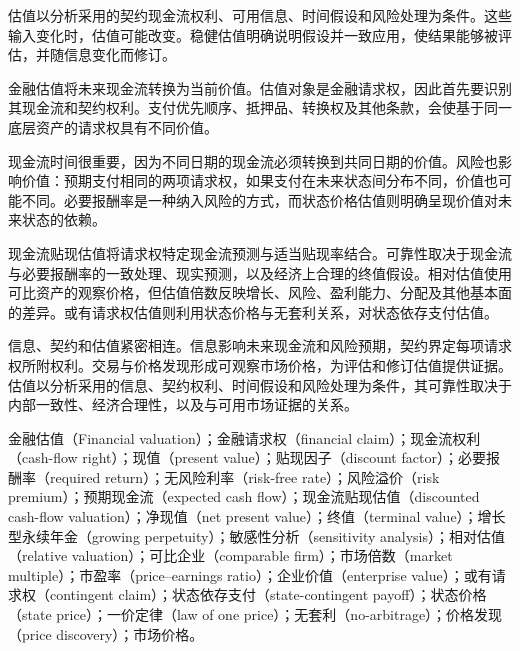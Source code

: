 \begin{tcolorbox}[
  enhanced,
  breakable,
  colback=white,
  colframe=FinanceBlue,
  boxrule=0.7pt,
  sharp corners,
  borderline west={2.2pt}{0pt}{FinanceBlue},
  title=\textbf{金融视角：估值以假设为条件},
  coltitle=white,
  colbacktitle=FinanceBlue,
  fonttitle=\bfseries,
  before skip=1.2em,
  after skip=1.2em
]

估值以分析采用的契约现金流权利、可用信息、时间假设和风险处理为条件。这些输入变化时，估值可能改变。稳健估值明确说明假设并一致应用，使结果能够被评估，并随信息变化而修订。

\end{tcolorbox}



金融估值将未来现金流转换为当前价值。估值对象是金融请求权，因此首先要识别其现金流和契约权利。支付优先顺序、抵押品、转换权及其他条款，会使基于同一底层资产的请求权具有不同价值。

现金流时间很重要，因为不同日期的现金流必须转换到共同日期的价值。风险也影响价值：预期支付相同的两项请求权，如果支付在未来状态间分布不同，价值也可能不同。必要报酬率是一种纳入风险的方式，而状态价格估值则明确呈现价值对未来状态的依赖。

现金流贴现估值将请求权特定现金流预测与适当贴现率结合。可靠性取决于现金流与必要报酬率的一致处理、现实预测，以及经济上合理的终值假设。相对估值使用可比资产的观察价格，但估值倍数反映增长、风险、盈利能力、分配及其他基本面的差异。或有请求权估值则利用状态价格与无套利关系，对状态依存支付估值。

信息、契约和估值紧密相连。信息影响未来现金流和风险预期，契约界定每项请求权所附权利。交易与价格发现形成可观察市场价格，为评估和修订估值提供证据。估值以分析采用的信息、契约权利、时间假设和风险处理为条件，其可靠性取决于内部一致性、经济合理性，以及与可用市场证据的关系。



金融估值（Financial valuation）；金融请求权（financial claim）；现金流权利（cash-flow right）；现值（present value）；贴现因子（discount factor）；必要报酬率（required return）；无风险利率（risk-free rate）；风险溢价（risk premium）；预期现金流（expected cash flow）；现金流贴现估值（discounted cash-flow valuation）；净现值（net present value）；终值（terminal value）；增长型永续年金（growing perpetuity）；敏感性分析（sensitivity analysis）；相对估值（relative valuation）；可比企业（comparable firm）；市场倍数（market multiple）；市盈率（price--earnings ratio）；企业价值（enterprise value）；或有请求权（contingent claim）；状态依存支付（state-contingent payoff）；状态价格（state price）；一价定律（law of one price）；无套利（no-arbitrage）；价格发现（price discovery）；市场价格。

